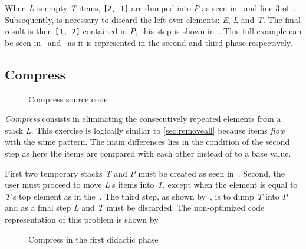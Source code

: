When \emph{L} is empty \emph{T} items, \texttt{[2, 1]} are dumped into
\emph{P} as seen in~ and line 3
of~. Subsequently, is necessary to discard the
left over elements: \emph{E}, \emph{L} and \emph{T}. The final result
is then \texttt{[1, 2]} contained in \emph{P}, this step is shown
in~. This full example can be seen
in~ and~ as it is represented in
the second and third phase respectively.

\FloatBarrier
\subsection{Compress}

\renewcommand*\FancyVerbStartString{BEGIN-COMPRESS}
\renewcommand*\FancyVerbStopString{END-COMPRESS}
\begin{figure}[h!]
  \caption{Compress source code}
  \label{fig:code:compress}
\end{figure}

\emph{Compress} consists in eliminating the consecutively repeated
elements from a stack \emph{L}. This exercise is logically similar
to \vref{sec:removeall} because items \emph{flow} with the same
pattern. The main differences lies in the condition of the second step
as here the items are compared with each other instead of to a base
value.

First two temporary stacks \emph{T} and \emph{P} must be
created as seen in~. Second, the user must
proceed to move \emph{L}'s items into \emph{T}, except when the
element is equal to \emph{T}'s top element as in
the~. The third step, as
shown by~, is to dump
\emph{T} into \emph{P} and as a final step \emph{L} and \emph{T}
must be discarded. The non\hyp{}optimized \erlang code representation
of this problem is shown by~

\begin{figure}[h!]
  \centering
  \caption{Compress in the first didactic phase}
\end{figure}

